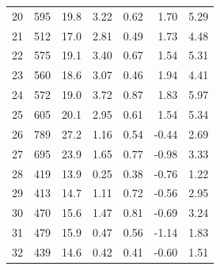 \begin{longtable}{rrrrrrr}
  20  &  595 &  19.8 &    3.22 &   0.62 &     1.70 &    5.29 \\
  21  &  512 &  17.0 &    2.81 &   0.49 &     1.73 &    4.48 \\
  22  &  575 &  19.1 &    3.40 &   0.67 &     1.54 &    5.31 \\
  23  &  560 &  18.6 &    3.07 &   0.46 &     1.94 &    4.41 \\
  24  &  572 &  19.0 &    3.72 &   0.87 &     1.83 &    5.97 \\
  25  &  605 &  20.1 &    2.95 &   0.61 &     1.54 &    5.34 \\
  26  &  789 &  27.2 &    1.16 &   0.54 &    -0.44 &    2.69 \\
  27  &  695 &  23.9 &    1.65 &   0.77 &    -0.98 &    3.33 \\
  28  &  419 &  13.9 &    0.25 &   0.38 &    -0.76 &    1.22 \\
  29  &  413 &  14.7 &    1.11 &   0.72 &    -0.56 &    2.95 \\
  30  &  470 &  15.6 &    1.47 &   0.81 &    -0.69 &    3.24 \\
  31  &  479 &  15.9 &    0.47 &   0.56 &    -1.14 &    1.83 \\
  32  &  439 &  14.6 &    0.42 &   0.41 &    -0.60 &    1.51 \\
\end{longtable}
